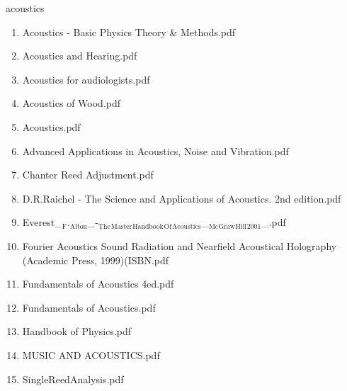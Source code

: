 \documentclass[11pt]{article}
\begin{document}
\item acoustics
\label{sec-1-1-1-1-11-19-23}
\begin{enumerate}
\item Acoustics - Basic Physics Theory \& Methods.pdf
\label{sec-1-1-1-1-11-19-23-1}

\item Acoustics and Hearing.pdf
\label{sec-1-1-1-1-11-19-23-2}

\item Acoustics for audiologists.pdf
\label{sec-1-1-1-1-11-19-23-3}

\item Acoustics of Wood.pdf
\label{sec-1-1-1-1-11-19-23-4}

\item Acoustics.pdf
\label{sec-1-1-1-1-11-19-23-5}

\item Advanced Applications in Acoustics, Noise and Vibration.pdf
\label{sec-1-1-1-1-11-19-23-6}

\item Chanter Reed Adjustment.pdf
\label{sec-1-1-1-1-11-19-23-7}

\item D.R.Raichel - The Science and Applications of Acoustics. 2nd edition.pdf
\label{sec-1-1-1-1-11-19-23-8}

\item Everest\_$_{\text{F}}$.$_{\text{Alton}}$\_-$_{\text{The}}$$_{\text{Master}}$$_{\text{Handbook}}$$_{\text{Of}}$$_{\text{Acoustics}}$\_$_{\text{McGraw}}$$_{\text{Hill}}$$_{\text{2001}}$\_.pdf
\label{sec-1-1-1-1-11-19-23-9}

\item Fourier Acoustics Sound Radiation and Nearfield Acoustical Holography (Academic Press, 1999)(ISBN.pdf
\label{sec-1-1-1-1-11-19-23-10}

\item Fundamentals of Acoustics 4ed.pdf
\label{sec-1-1-1-1-11-19-23-11}

\item Fundamentals of Acoustics.pdf
\label{sec-1-1-1-1-11-19-23-12}

\item Handbook of Physics.pdf
\label{sec-1-1-1-1-11-19-23-13}

\item MUSIC AND ACOUSTICS.pdf
\label{sec-1-1-1-1-11-19-23-14}

\item SingleReedAnalysis.pdf
\label{sec-1-1-1-1-11-19-23-15}


\end{enumerate}
\end{document}
